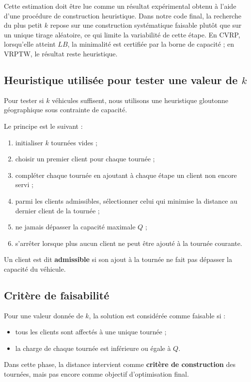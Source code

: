\documentclass[11pt,a4paper]{article}
\begin{document}
Cette estimation doit être lue comme un résultat expérimental obtenu à l'aide d'une procédure de construction heuristique. Dans notre code final, la recherche du plus petit \(k\) repose sur une construction systématique faisable plutôt que sur un unique tirage aléatoire, ce qui limite la variabilité de cette étape. En CVRP, lorsqu'elle atteint \(LB\), la minimalité est certifiée par la borne de capacité ; en VRPTW, le résultat reste heuristique.

\subsection{Heuristique utilisée pour tester une valeur de \(k\)}
Pour tester si \(k\) véhicules suffisent, nous utilisons une heuristique gloutonne géographique sous contrainte de capacité.

Le principe est le suivant :
\begin{enumerate}[label=\arabic*.]
    \item initialiser \(k\) tournées vides ;
    \item choisir un premier client pour chaque tournée ;
    \item compléter chaque tournée en ajoutant à chaque étape un client non encore servi ;
    \item parmi les clients admissibles, sélectionner celui qui minimise la distance au dernier client de la tournée ;
    \item ne jamais dépasser la capacité maximale \(Q\) ;
    \item s'arrêter lorsque plus aucun client ne peut être ajouté à la tournée courante.
\end{enumerate}

Un client est dit \textbf{admissible} si son ajout à la tournée ne fait pas dépasser la capacité du véhicule.

\subsection{Critère de faisabilité}
Pour une valeur donnée de \(k\), la solution est considérée comme faisable si :
\begin{itemize}
    \item tous les clients sont affectés à une unique tournée ;
    \item la charge de chaque tournée est inférieure ou égale à \(Q\).
\end{itemize}

Dans cette phase, la distance intervient comme \textbf{critère de construction} des tournées, mais pas encore comme objectif d'optimisation final.
\end{document}
